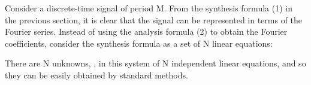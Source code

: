 \documentclass{article}
\begin{document}
\begin{CellGroup}


Consider a discrete-time signal  of period M. From the synthesis formula (1) in the previous section, it is clear that the signal
can be represented in terms of the Fourier series. Instead of using the analysis formula (2) to obtain the Fourier coefficients, consider the synthesis
formula as a set of N linear equations:




There are N unknowns, , in this system of N independent linear equations, and
so they can be easily obtained by standard methods.



\begin{CellGroup}


\begin{CellGroup}

\end{CellGroup}

\end{CellGroup}

\end{CellGroup}
\end{document}
